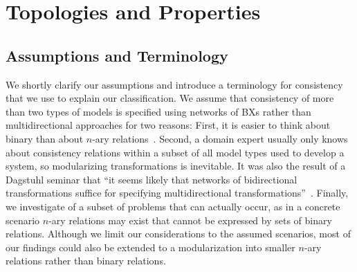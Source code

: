 \chapter{Topologies and Properties}
\label{chap:properties}

\section{Assumptions and Terminology}
\label{chap:properties:terminology}

We shortly clarify our assumptions and introduce a terminology for consistency %
that we %
use to explain our classification.
We assume that consistency of more than two types of models is specified using networks of \acp{BX} rather than multidirectional approaches for two reasons:
First, it is easier to think about binary than about $n$-ary relations~\cite{stevens2017a}.
Second, a domain expert usually only knows about consistency relations within a subset of all model types used to develop a system, so modularizing transformations is inevitable.
It was also the result of a Dagstuhl seminar that \enquote{it seems likely that networks of bidirectional transformations suffice for specifying multidirectional transformations}~\cite[p. 7]{cleve2019dagstuhl}.
Finally, we investigate of a subset of problems that can actually occur, as in a concrete scenario $n$-ary relations may exist that cannot be expressed by sets of binary relations.
Although we limit our considerations to the assumed scenarios, most of our findings could also be extended to a modularization into smaller $n$-ary relations rather than binary relations.


